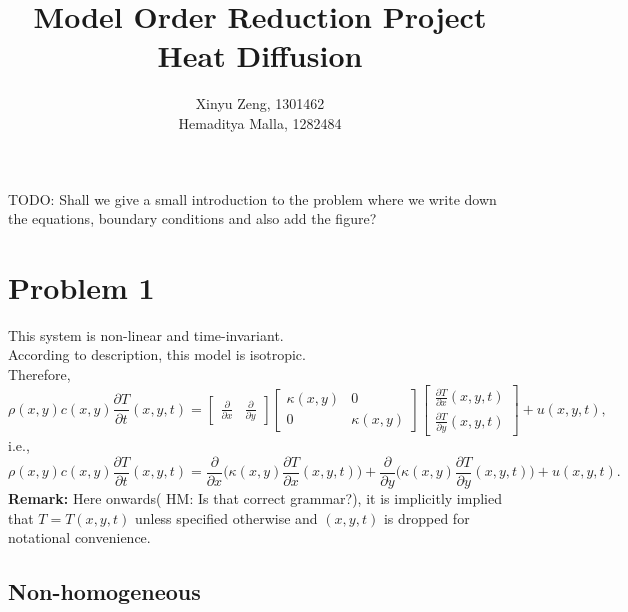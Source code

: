 \documentclass[12pt]{article}
\newcommand{\TODO}[1]{{\color{red} TODO: #1}}
\newcommand{\HM}[1]{{\color{green} HM: #1}}
\newcommand{\parder}[2]{\frac{\partial #1}{\partial #2}}
\begin{document}
 
 
\title{%
  Model Order Reduction Project \\
  \large Heat Diffusion} 
 
 \author{ %
Xinyu Zeng, 1301462 \\
Hemaditya Malla, 1282484
}
 
\maketitle
\tableofcontents
\pagebreak
\TODO{Shall we give a small introduction to the problem where we write down the equations, boundary conditions and also add the figure?}
\section*{Problem 1}

This system is non-linear and time-invariant.\\
According to description, this model is isotropic.\\ Therefore,
\begin{equation}
\rho (x,y)c(x,y)\parder{T}{t}(x,y,t)=
\begin{bmatrix}
\parder{ }{x} & \parder{ }{y}
\end{bmatrix}
\begin{bmatrix}
\kappa(x,y) & 0\\
0 & \kappa(x,y) 
\end{bmatrix}
\begin{bmatrix}
\parder{T}{x}(x,y,t)\\
\parder{T}{y}(x,y,t)
\end{bmatrix}
+u(x,y,t),
\label{eqn:main_prob1}
\end{equation}
i.e.,
\begin{equation}
\rho (x,y)c(x,y)\parder{T}{t}(x,y,t)= \parder{ }{x}\bigg(\kappa(x,y)\parder{T}{x} (x,y,t)\bigg) + \parder{ }{y}\bigg(\kappa(x,y)\parder{T}{y} (x,y,t)\bigg)+u(x,y,t).
\label{eqn:simplified_prob1}
\end{equation}
\textbf{Remark:} Here onwards(\HM{Is that correct grammar?}), it is implicitly implied that $T = T(x,y,t)$ unless specified otherwise and $(x,y,t)$ is dropped for notational convenience.
\subsection*{Non-homogeneous} 
\end{document}
